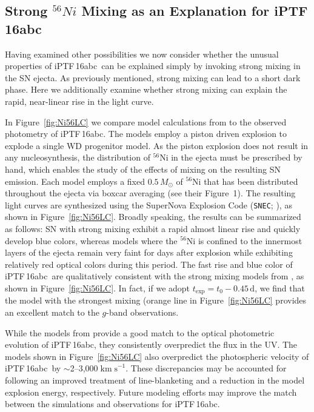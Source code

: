 \documentclass[twocolumn]{aastex61}
\newcommand{\sm}{M_\odot}
\newcommand{\abc}{iPTF\,16abc}
\begin{document}
\subsection{Strong $^{56}Ni$ Mixing as an Explanation for \abc}
\label{sec:Ni_mixing}

Having examined other possibilities we now consider whether the unusual properties of \abc\ can be explained simply by invoking strong mixing in the SN ejecta. As previously mentioned, strong mixing can lead to a short dark phase. Here we additionally examine whether strong mixing can explain the rapid, near-linear rise in the light curve.

In Figure~\ref{fig:Ni56LC} we compare model calculations from \citet{2016ApJ...826...96P} to the observed photometry of \abc. The \citeauthor{2016ApJ...826...96P} models employ a piston driven explosion to explode a single WD progenitor model. As the piston explosion does not result in any nucleosynthesis, the distribution of $^{56}$Ni in the ejecta must be prescribed by hand, which enables the study of the effects of mixing on the resulting SN emission. Each model employs a fixed $0.5\,\sm$ of $^{56}$Ni that has been distributed throughout the ejecta via boxcar averaging (see their Figure~1). The resulting light curves are synthesized using the SuperNova Explosion Code (\texttt{SNEC}; \citealt{2015ApJ...814...63M}), as shown in Figure~\ref{fig:Ni56LC}. Broadly speaking, the results can be summarized as follows: SN with strong mixing exhibit a rapid almost linear rise and quickly develop blue colors, whereas models where the $^{56}$Ni is confined to the innermost layers of the ejecta remain very faint for days after explosion while exhibiting relatively red optical colors during this period. The fast rise and blue color of \abc\ are qualitatively consistent with the strong mixing models from \citet{2016ApJ...826...96P}, as shown in Figure~\ref{fig:Ni56LC}. In fact, if we adopt $t_\mathrm{exp} = t_0 - 0.45 \, \mathrm{d}$, we find that the model with the strongest mixing (orange line in Figure~\ref{fig:Ni56LC} provides an excellent match to the $g$-band observations.

While the models from \citet{2016ApJ...826...96P} provide a good match to the optical photometric evolution of \abc, they consistently overpredict the flux in the UV. The models shown in Figure~\ref{fig:Ni56LC} also overpredict the photospheric velocity of \abc\ by $\sim$2--3,000$\; \mathrm{km \; s}^{-1}$. These discrepancies may be accounted for following an improved treatment of line-blanketing and a reduction in the model explosion energy, respectively. Future modeling efforts may improve the match between the simulations and observations for \abc.
\end{document}
